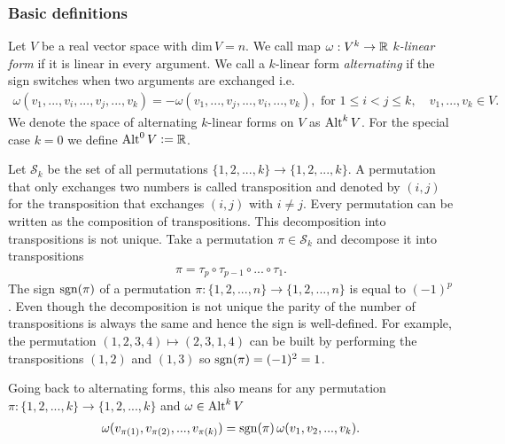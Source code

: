 \documentclass[../master_thesis.tex]{subfiles}
\begin{document}
\subsubsection{Basic definitions}

\begin{definition}
    Let $V$ be a real vector space with $\text{dim}\,V = n$.
    We call map $\omega: V^k \rightarrow \mathbb{R}$ 
    \textit{$k$-linear form} if it is linear in every argument.
    We call a $k$-linear form 
    \textit{alternating} if the sign switches when two arguments are exchanged 
    i.e.
    \begin{align*}
        \omega(v_1,...,v_i,...,v_j,...,v_k)
        = - \omega(v_1,...,v_j,...,v_i,...,v_k), \text{ for } 1\leq i < j \leq k,
        \quad v_1,...,v_k \in V.
    \end{align*}
    We denote the space of alternating $k$-linear forms on $V$ as ${\text{Alt}^{k}\,V}$.
    For the special case $k=0$ we define ${\text{Alt}^{0}\,V} \vcentcolon= \mathbb{R}$.
\end{definition}

Let $\mathcal{S}_k$ be the set of all permutations 
$\{ 1, 2, ..., k\} \rightarrow \{ 1, 2, ..., k \}$. A 
permutation that only exchanges two numbers is called transposition 
and denoted by $(i,j)$ for the transposition that exchanges $(i,j)$ with 
$i \neq j$. Every permutation can be written as the composition of 
transpositions. This decomposition into transpositions is not unique.
Take a permutation $\pi \in \mathcal{S}_k$ and decompose it into transpositions
\begin{align*}
    \pi = \tau_p \circ \tau_{p-1} \circ ... \circ \tau_1.
\end{align*}
The sign $\operatorname{sgn}(\pi)$ of a permutation 
$\pi: \{ 1,2,...,n\} \rightarrow \{ 1,2, ..., n\}$ is equal to $(-1)^p$.
Even though the decomposition is not unique the parity of the number of
transpositions is always the same and hence the sign is well-defined.
For example, the permutation $(1,2,3,4) \mapsto (2,3,1,4)$ 
can be built by performing the transpositions $(1,2)$ and $(1,3)$ so 
$\operatorname{sgn}(\pi) = (-1)^2 = 1$. 

Going back to alternating forms, this also means for any permutation 
$\pi: \{1,2,...,k\} \rightarrow \{1,2,...,k\}$ and 
$\omega \in {\text{Alt}^{k}\,V}$
\begin{align*}
    \omega(v_{\pi(1)},v_{\pi(2)},...,v_{\pi(k)})
    = \operatorname{sgn}(\pi)\, \omega(v_1, v_2,..., v_k).
\end{align*}
\end{document}
